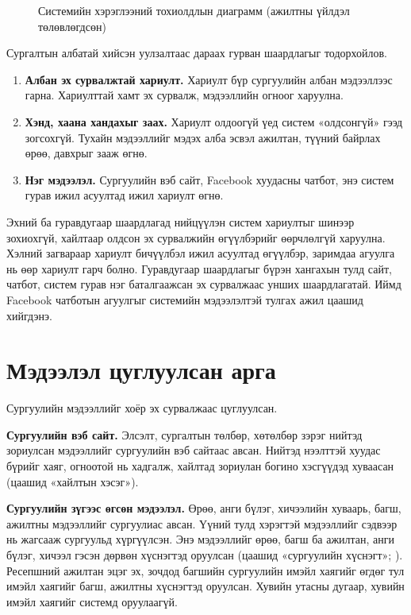 \begin{figure}[ht]
\centering
{}
\caption{Системийн хэрэглээний тохиолдлын диаграмм (ажилтны үйлдэл төлөвлөгдсөн)}
\label{fig:usecase}
\end{figure}

Сургалтын албатай хийсэн уулзалтаас дараах гурван шаардлагыг тодорхойлов.
\begin{enumerate}
    \item \textbf{Албан эх сурвалжтай хариулт.} Хариулт бүр сургуулийн албан мэдээллээс гарна. Хариулттай хамт эх сурвалж, мэдээллийн огноог харуулна.
    \item \textbf{Хэнд, хаана хандахыг заах.} Хариулт олдоогүй үед систем «олдсонгүй» гээд зогсохгүй. Тухайн мэдээллийг мэдэх алба эсвэл ажилтан, түүний байрлах өрөө, давхрыг зааж өгнө.
    \item \textbf{Нэг мэдээлэл.} Сургуулийн вэб сайт, Facebook хуудасны чатбот, энэ систем гурав ижил асуултад ижил хариулт өгнө.
\end{enumerate}

Эхний ба гуравдугаар шаардлагад нийцүүлэн систем хариултыг шинээр зохиохгүй, хайлтаар олдсон эх сурвалжийн өгүүлбэрийг өөрчлөлгүй харуулна. Хэлний загвараар хариулт бичүүлбэл ижил асуултад өгүүлбэр, заримдаа агуулга нь өөр хариулт гарч болно. Гуравдугаар шаардлагыг бүрэн хангахын тулд сайт, чатбот, систем гурав нэг баталгаажсан эх сурвалжаас унших шаардлагатай. Иймд Facebook чатботын агуулгыг системийн мэдээлэлтэй тулгах ажил цаашид хийгдэнэ.

\section{Мэдээлэл цуглуулсан арга}
\label{sec:data-sources}

Сургуулийн мэдээллийг хоёр эх сурвалжаас цуглуулсан.

\textbf{Сургуулийн вэб сайт.} Элсэлт, сургалтын төлбөр, хөтөлбөр зэрэг нийтэд зориулсан мэдээллийг сургуулийн вэб сайтаас авсан. Нийтэд нээлттэй хуудас бүрийг хаяг, огноотой нь хадгалж, хайлтад зориулан богино хэсгүүдэд хуваасан (цаашид «хайлтын хэсэг»).

\textbf{Сургуулийн зүгээс өгсөн мэдээлэл.} Өрөө, анги бүлэг, хичээлийн хуваарь, багш, ажилтны мэдээллийг сургуулиас авсан. Үүний тулд хэрэгтэй мэдээллийг сэдвээр нь жагсааж сургуульд хүргүүлсэн. Энэ мэдээллийг өрөө, багш ба ажилтан, анги бүлэг, хичээл гэсэн дөрвөн хүснэгтэд оруулсан (цаашид «сургуулийн хүснэгт»; ). Ресепшний ажилтан эцэг эх, зочдод багшийн сургуулийн имэйл хаягийг өгдөг тул имэйл хаягийг багш, ажилтны хүснэгтэд оруулсан. Хувийн утасны дугаар, хувийн имэйл хаягийг системд оруулаагүй.

